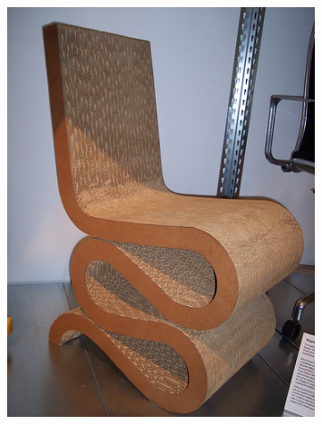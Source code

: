 \begin{figure}[H]
\begin{subfigure}[b]{0.2\textwidth}
        \includegraphics[width=\textwidth]{Figs/Problem/chair2.jpeg}
        \caption{}
    \end{subfigure}
    \begin{subfigure}[b]{0.2\textwidth}
        \center

\end{subfigure}
\end{figure}

